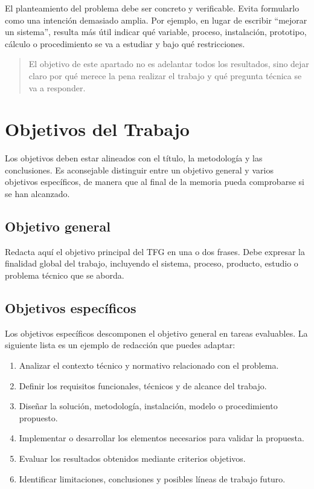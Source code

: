 El planteamiento del problema debe ser concreto y verificable. Evita formularlo
como una intención demasiado amplia. Por ejemplo, en lugar de escribir
``mejorar un sistema'', resulta más útil indicar qué variable, proceso,
instalación, prototipo, cálculo o procedimiento se va a estudiar y bajo qué
restricciones.

\begin{quote}
El objetivo de este apartado no es adelantar todos los resultados, sino dejar
claro por qué merece la pena realizar el trabajo y qué pregunta técnica se va a
responder.
\end{quote}

\section{Objetivos del Trabajo}
\label{sec:objetivos}

Los objetivos deben estar alineados con el título, la metodología y las
conclusiones. Es aconsejable distinguir entre un objetivo general y varios
objetivos específicos, de manera que al final de la memoria pueda comprobarse si
se han alcanzado.

\subsection{Objetivo general}
\label{subsec:objetivo-general}

Redacta aquí el objetivo principal del TFG en una o dos frases. Debe expresar la
finalidad global del trabajo, incluyendo el sistema, proceso, producto, estudio
o problema técnico que se aborda.

\subsection{Objetivos específicos}
\label{subsec:objetivos-especificos}

Los objetivos específicos descomponen el objetivo general en tareas evaluables.
La siguiente lista es un ejemplo de redacción que puedes adaptar:

\begin{enumerate}
    \item Analizar el contexto técnico y normativo relacionado con el problema.
    \item Definir los requisitos funcionales, técnicos y de alcance del trabajo.
    \item Diseñar la solución, metodología, instalación, modelo o procedimiento propuesto.
    \item Implementar o desarrollar los elementos necesarios para validar la propuesta.
    \item Evaluar los resultados obtenidos mediante criterios objetivos.
    \item Identificar limitaciones, conclusiones y posibles líneas de trabajo futuro.
\end{enumerate}

